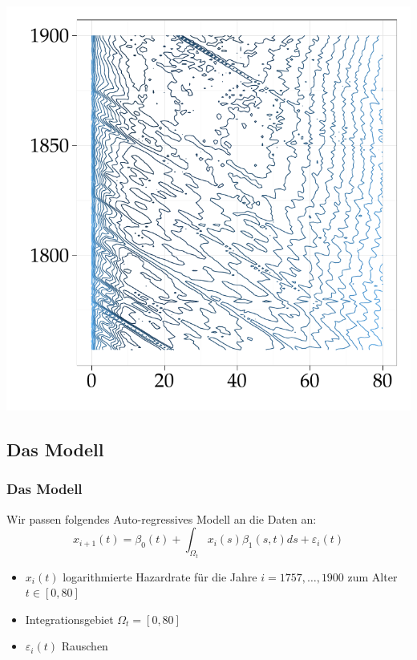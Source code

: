\documentclass[xcolor=dvipsnames, compress, serif, professionalfont, handout]{beamer}
\newenvironment{knitrout}{}{} %
\renewenvironment{knitrout}{\begin{footnotesize}}{\end{footnotesize}}
\begin{document}
\begin{frame}[fragile]
\begin{minipage}{0.48\textwidth}
\begin{knitrout}
{\centering \includegraphics[width=\linewidth,height=\linewidth]{figure/graphics-GR_res_org} 

}


\end{knitrout}

  \end{minipage}
\end{frame}

%
%

\subsection{Das Modell}
\begin{frame}[fragile]
\frametitle{Das Modell}
  Wir passen folgendes Auto-regressives Modell an die Daten an: 
  $$
    x_{i+1}(t) = \beta_0(t) + \int_{\Omega_t} x_i(s) \beta_1(s, t)ds + \varepsilon_i(t)
  $$
  \begin{itemize}
    \item<1-> $x_i(t)$ logarithmierte Hazardrate f\"ur die Jahre 
          $i = 1757, \ldots, 1900$ zum Alter $t\in [0, 80]$
    \item<2-> Integrationsgebiet $\Omega_t = [0, 80]$
    \item<3-> $\varepsilon_i(t)$ Rauschen
  \end{itemize}
\end{frame}
\end{document}
